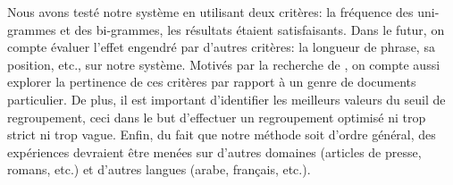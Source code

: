 \documentclass[a4paper,12pt,oneside]{../use/ESIthesis}
\begin{document}
Nous avons testé notre système en utilisant deux critères: la fréquence des uni-grammes et des bi-grammes, les résultats étaient satisfaisants. 
Dans le futur, on compte évaluer l'effet engendré par d'autres critères: la longueur de phrase, sa position, etc., sur notre système. 
Motivés par la recherche de \cite{10-yatsko-al}, on compte aussi explorer la pertinence de ces critères par rapport à un genre de documents particulier. 
De plus, il est important d'identifier les meilleurs valeurs du seuil de regroupement, ceci dans le but d'effectuer un regroupement optimisé ni trop strict ni trop vague.
Enfin, du fait que notre méthode soit d'ordre général, des expériences devraient être menées sur d'autres domaines (articles de presse, romans, etc.) et d'autres langues (arabe, français, etc.).


\ifx\wholebook\relax\else
 \cleardoublepage
  
 
 
\end{document}
